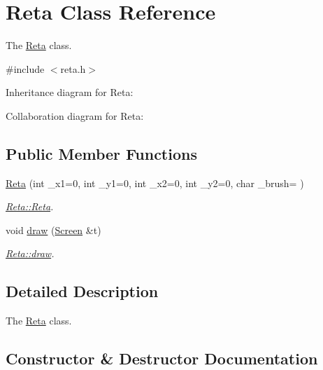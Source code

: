 \hypertarget{classReta}{}\section{Reta Class Reference}
\label{classReta}


The \hyperlink{classReta}{Reta} class.  




{\ttfamily \#include $<$reta.\+h$>$}



Inheritance diagram for Reta\+:


Collaboration diagram for Reta\+:
\subsection*{Public Member Functions}
\begin{DoxyCompactItemize}
\item 
\hyperlink{classReta_aa3fc5163f0e9f677d805b9d3fe5e324e}{Reta} (int \+\_\+x1=0, int \+\_\+y1=0, int \+\_\+x2=0, int \+\_\+y2=0, char \+\_\+brush=\textquotesingle{} \textquotesingle{})
\begin{DoxyCompactList}\small\item\em \hyperlink{classReta_aa3fc5163f0e9f677d805b9d3fe5e324e}{Reta\+::\+Reta}. \end{DoxyCompactList}\item 
void \hyperlink{classReta_ac2e9805183cd474b62bffd8b032cd780}{draw} (\hyperlink{classScreen}{Screen} \&t)
\begin{DoxyCompactList}\small\item\em \hyperlink{classReta_ac2e9805183cd474b62bffd8b032cd780}{Reta\+::draw}. \end{DoxyCompactList}\end{DoxyCompactItemize}


\subsection{Detailed Description}
The \hyperlink{classReta}{Reta} class. 

\subsection{Constructor \& Destructor Documentation}
\mbox{\label{classReta_aa3fc5163f0e9f677d805b9d3fe5e324e}} 
